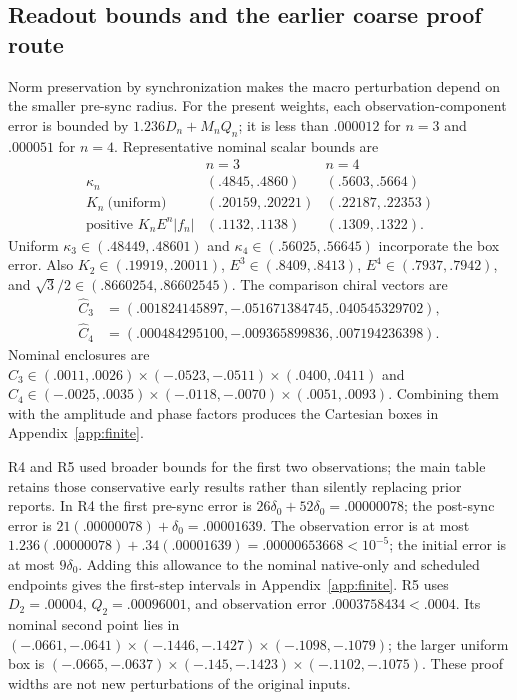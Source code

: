 \documentclass[11pt,a4paper]{article}
\numberwithin{equation}{section}
\begin{document}
\subsection{Readout bounds and the earlier coarse proof route}
Norm preservation by synchronization makes the macro perturbation depend
on the smaller pre-sync radius. For the present weights,
each observation-component error is bounded by
$1.236D_n+M_nQ_n$; it is less than $.000012$ for $n=3$ and
$.000051$ for $n=4$. Representative nominal scalar bounds are
\[
\begin{array}{c|cc}
&n=3&n=4\\ \hline
\kappa_n&(.4845,.4860)&(.5603,.5664)\\
K_n\ \text{(uniform)}&(.20159,.20221)&(.22187,.22353)\\
\text{positive }K_nE^n|f_n|&(.1132,.1138)&(.1309,.1322).
\end{array}
\]
Uniform $\kappa_3\in(.48449,.48601)$ and
$\kappa_4\in(.56025,.56645)$ incorporate the box error.
Also $K_2\in(.19919,.20011)$,
$E^3\in(.8409,.8413)$, $E^4\in(.7937,.7942)$, and
$\sqrt3/2\in(.8660254,.86602545)$.
The comparison chiral vectors are
\[
\begin{aligned}
\widehat C_3&=(.001824145897,-.051671384745,.040545329702),\\
\widehat C_4&=(.000484295100,-.009365899836,.007194236398).
\end{aligned}
\]
Nominal enclosures are
$C_3\in(.0011,.0026)\times(-.0523,-.0511)\times(.0400,.0411)$ and
$C_4\in(-.0025,.0035)\times(-.0118,-.0070)\times(.0051,.0093)$.
Combining them with the amplitude and phase factors produces the Cartesian
boxes in Appendix~\ref{app:finite}.

R4 and R5 used broader bounds for the first two observations; the main table
retains those conservative early results rather than silently replacing
prior reports. In R4 the first pre-sync error is
$26\delta_0+52\delta_0=.00000078$; the post-sync error is
$21(.00000078)+\delta_0=.00001639$.
The observation error is at most
$1.236(.00000078)+.34(.00001639)=.00000653668<10^{-5}$;
the initial error is at most $9\delta_0$.
Adding this allowance to the nominal native-only and scheduled endpoints
gives the first-step intervals in Appendix~\ref{app:finite}.
R5 uses $D_2=.00004$, $Q_2=.00096001$, and
observation error $.0003758434<.0004$.
Its nominal second point lies in
$(-.0661,-.0641)\times(-.1446,-.1427)\times(-.1098,-.1079)$;
the larger uniform box is
$(-.0665,-.0637)\times(-.145,-.1423)\times(-.1102,-.1075)$.
These proof widths are not new perturbations of the original inputs.
\end{document}
